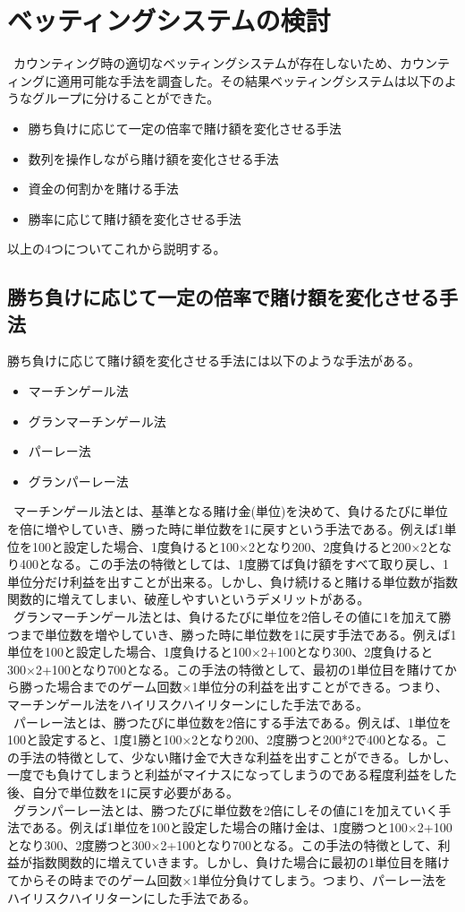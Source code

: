 ﻿\section{ベッティングシステムの検討}
\ カウンティング時の適切なベッティングシステムが存在しないため、カウンティングに適用可能な手法を調査した。その結果ベッティングシステムは以下のようなグループに分けることができた。
\begin{itemize}
\item 勝ち負けに応じて一定の倍率で賭け額を変化させる手法
\item 数列を操作しながら賭け額を変化させる手法
\item 資金の何割かを賭ける手法
\item 勝率に応じて賭け額を変化させる手法
\end{itemize}
以上の4つについてこれから説明する。

\subsection{勝ち負けに応じて一定の倍率で賭け額を変化させる手法}
勝ち負けに応じて賭け額を変化させる手法には以下のような手法がある。
 \begin{itemize}
 \item マーチンゲール法
 \item グランマーチンゲール法
 \item パーレー法
 \item グランパーレー法
 \end{itemize}
\ マーチンゲール法とは、基準となる賭け金(単位)を決めて、負けるたびに単位を倍に増やしていき、勝った時に単位数を1に戻すという手法である。例えば1単位を100と設定した場合、1度負けると100×2となり200、2度負けると200×2となり400となる。この手法の特徴としては、1度勝てば負け額をすべて取り戻し、1単位分だけ利益を出すことが出来る。しかし、負け続けると賭ける単位数が指数関数的に増えてしまい、破産しやすいというデメリットがある。\\
\ グランマーチンゲール法とは、負けるたびに単位を2倍しその値に1を加えて勝つまで単位数を増やしていき、勝った時に単位数を1に戻す手法である。例えば1単位を100と設定した場合、1度負けると100×2+100となり300、2度負けると300×2+100となり700となる。この手法の特徴として、最初の1単位目を賭けてから勝った場合までのゲーム回数×1単位分の利益を出すことができる。つまり、マーチンゲール法をハイリスクハイリターンにした手法である。\\
\ パーレー法とは、勝つたびに単位数を2倍にする手法である。例えば、1単位を100と設定すると、1度1勝と100×2となり200、2度勝つと200*2で400となる。この手法の特徴として、少ない賭け金で大きな利益を出すことができる。しかし、一度でも負けてしまうと利益がマイナスになってしまうのである程度利益をした後、自分で単位数を1に戻す必要がある。\\
\ グランパーレー法とは、勝つたびに単位数を2倍にしその値に1を加えていく手法である。例えば1単位を100と設定した場合の賭け金は、1度勝つと100×2+100となり300、2度勝つと300×2+100となり700となる。この手法の特徴として、利益が指数関数的に増えていきます。しかし、負けた場合に最初の1単位目を賭けてからその時までのゲーム回数×1単位分負けてしまう。つまり、パーレー法をハイリスクハイリターンにした手法である。\\

